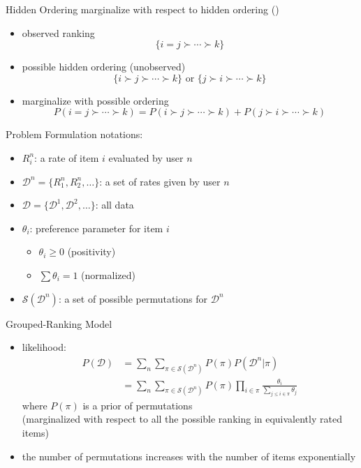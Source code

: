 \documentclass[fleqn,aspectratio=1610]{beamer}
\begin{document}
\begin{frame}[label={sec:orgf065d68}]{Hidden Ordering}
marginalize with respect to hidden ordering (\cite{HinoFujimotoMurata2010})

\begin{itemize}
\item observed ranking
\begin{equation}
  \{i=j\succ\cdots\succ k\}
\end{equation}
\item possible hidden ordering (unobserved)
\begin{equation}
  \{i\succ j\succ\cdots\succ k\}
  \text{ or }
  \{j\succ i\succ\cdots\succ k\}
\end{equation}
\item marginalize with possible ordering 
\begin{equation}
  P(i=j\succ\cdots\succ k)
  =P(i\succ j\succ\cdots\succ k)
  +P(j\succ i\succ\cdots\succ k)
\end{equation}
\end{itemize}
\end{frame}

\begin{frame}[label={sec:orge44554a}]{Problem Formulation}
notations:
\begin{itemize}
\item \(R_i^n\): 
a rate of item \(i\) evaluated by user \(n\)
\item \(\mathcal{D}^n=\{R_1^n,R_2^n,\dots\}\): 
a set of rates given by user \(n\)
\item \(\mathcal{D}=\{\mathcal{D}^1,\mathcal{D}^2,\dots\}\): 
all data
\medskip
\item \(\theta_i\): preference parameter for item \(i\)
\begin{itemize}
\item \(\theta_i\ge0\) (positivity)
\item \(\sum\theta_i=1\) (normalized)
\end{itemize}
\item \(\mathcal{S}(\mathcal{D}^n)\):
a set of possible permutations for \(\mathcal{D}^n\)
\end{itemize}
\end{frame}

\begin{frame}[label={sec:org1af96c9}]{Grouped-Ranking Model}
\begin{itemize}
\item likelihood:
\begin{align}
  P(\mathcal{D})
  &=\sum_{n}\sum_{\pi\in\mathcal{S}(\mathcal{D}^n)}
    P(\pi)P(\mathcal{D}^n|\pi)\\
  &=\sum_{n}\sum_{\pi\in\mathcal{S}(\mathcal{D}^n)}
    P(\pi)\prod_{i\in\pi}\frac{\theta_i}{\sum_{j\le i\in\pi}\theta_j}
\end{align}
where \(P(\pi)\) is a prior of permutations\\[0pt]
(marginalized with respect to all the possible ranking in
equivalently rated items)
\item the number of permutations increases 
with the number of items \alert{exponentially}
\end{itemize}
\end{frame}
\end{document}
